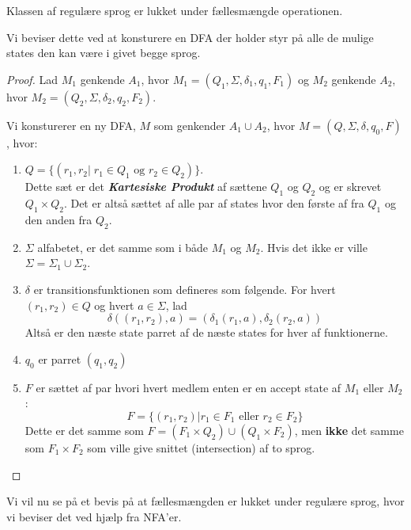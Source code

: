 \begin{theorem}
	Klassen af regulære sprog er lukket under fællesmængde operationen.
\end{theorem}

Vi beviser dette ved at konsturere en DFA der holder styr på alle de mulige states den kan være i givet begge sprog.

\begin{proof}
	Lad $M_{1}$ genkende $A_{1}$, hvor $M_{1} = (Q_{1}, \Sigma, \delta_{1}, q_{1}, F_{1})$ og $M_{2}$ genkende $A_{2}$, hvor $M_{2} = (Q_{2}, \Sigma, \delta_{2}, q_{2}, F_{2})$.

	Vi konsturerer en ny DFA, $M$ som genkender $A_{1} \cup A_{2}$, hvor $M = (Q, \Sigma, \delta, q_{0}, F)$, hvor:
	\begin{enumerate}
		\item $Q = \{(r_{1}, r_{2}| \; r_{1} \in Q_{1} \text{ og } r_{2} \in Q_{2})\}$. \\
		      Dette sæt er det \textit{\textbf{Kartesiske Produkt}} af sættene $Q_{1}$ og $Q_{2}$ og er skrevet $Q_{1} \times Q_2$. Det er altså sættet af alle par af states hvor den første af fra $Q_{1}$ og den anden fra $Q_{2}$.
		\item $\Sigma$ alfabetet, er det samme som i både $M_1$ og $M_{2}$. Hvis det ikke er ville $\Sigma = \Sigma_{1} \cup \Sigma_{2}$.
		\item $\delta$ er transitionsfunktionen som defineres som følgende. For hvert $(r_{1}, r_{2}) \in Q$ og hvert $a \in \Sigma$, lad
		      \[\delta \left( (r_{1}, r_{2}), a \right) = \left(\delta_{1} (r_{1}, a), \delta_{2}(r_{2}, a) \right)\] Altså er den næste state parret af de næste states for hver af funktionerne.
		\item $q_{0}$ er parret $(q_{1}, q_{2})$
		\item $F$ er sættet af par hvori hvert medlem enten er en accept state af $M_1$ eller $M_{2}$: \[ F = \{(r_{1}, r_{2})| r_{1} \in F_{1} \text{ eller } r_{2} \in F_{2}\} \]
		      Dette er det samme som $F = (F_{1} \times Q_{2}) \cup (Q_{1} \times F_{2})$, men \textbf{ikke} det samme som $F_{1} \times F_{2}$ som ville give snittet (intersection) af to sprog.
	\end{enumerate}
\end{proof}

Vi vil nu se på et bevis på at fællesmængden er lukket under regulære sprog, hvor vi beviser det ved hjælp fra NFA'er.

